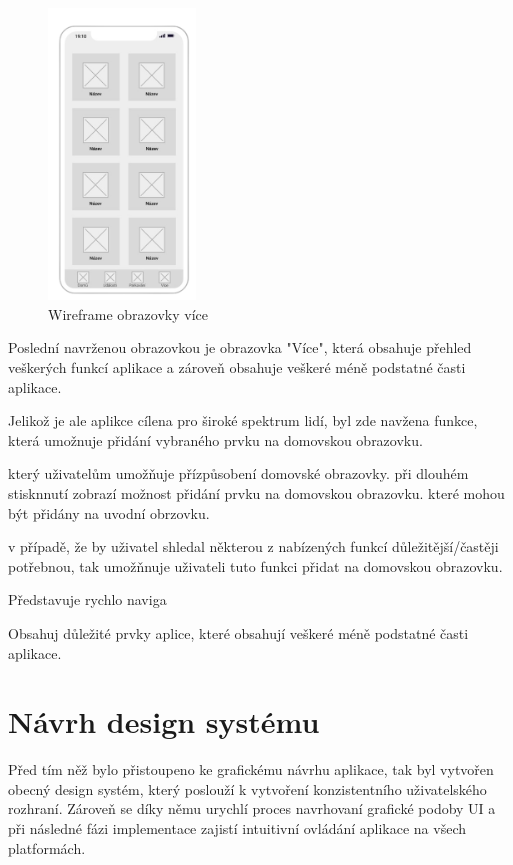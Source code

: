 \begin{figure}
  \centering
  \includegraphics[width=0.35\textwidth]{more_wireframe.png} 
  \caption{Wireframe obrazovky více}
\end{figure}

Poslední navrženou obrazovkou je obrazovka "Více", která obsahuje přehled veškerých funkcí aplikace a zároveň obsahuje veškeré méně podstatné 
časti aplikace.

Jelikož je ale aplikce cílena pro široké spektrum lidí, byl zde navžena funkce, která umožnuje přidání vybraného prvku na domovskou obrazovku.


který uživatelům umožňuje přízpůsobení domovské obrazovky.
při dlouhém stisknnutí zobrazí možnost přidání prvku na domovskou obrazovku.
které mohou být přidány na uvodní obrzovku.


v případě, že by uživatel shledal některou 
z nabízených funkcí důležitější/častěji potřebnou, tak umožňnuje uživateli tuto funkci přidat na domovskou obrazovku.

Představuje rychlo naviga

Obsahuj důležité prvky aplice, které obsahují veškeré méně podstatné časti aplikace.



\section{Návrh design systému} \label{designSystemSection}
Před tím něž bylo přistoupeno ke grafickému návrhu aplikace, tak byl vytvořen obecný design systém, který poslouží k vytvoření 
konzistentního uživatelského rozhraní. Zároveň se díky němu urychlí proces navrhovaní grafické podoby UI a při následné fázi implementace 
zajistí intuitivní ovládání aplikace na všech platformách. 

